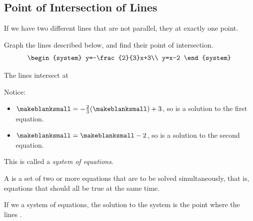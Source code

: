 \subsection{Point of Intersection of Lines} 
If we have two different lines that are not parallel, they \makeblank[1in] at exactly one point.
\begin{Example}
Graph the lines described below, and find their point of intersection.
\[
\begin{system}
y=-\frac{2}{3}x+3\\
y=x-2
\end{system}
\]
\begin{icpic}
\GraphLarge
\end{icpic}
The lines intersect at \blankpair
\end{Example}
Notice:
\begin{itemize}
\item $\makeblanksmall=-\frac{2}{3}(\makeblanksmall)+3$, so \blankpair is a solution to the first equation.
\item $\makeblanksmall=\makeblanksmall-2$, so \blankpair is a solution to the second equation.
\end{itemize}
This is called a \emph{system of equations}.
\begin{definition}
A  is a set of two or more equations that are to be solved simultaneously, that is, equations that should all be true at the same time.
\end{definition}
If we \makeblank[1in] a system of equations, the solution to the system is the point where the lines \makeblank[1in].